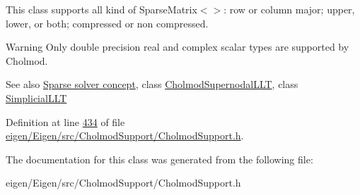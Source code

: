 This class supports all kind of Sparse\+Matrix$<$$>$\+: row or column major; upper, lower, or both; compressed or non compressed.

\begin{DoxyWarning}{Warning}
Only double precision real and complex scalar types are supported by Cholmod.
\end{DoxyWarning}
\begin{DoxySeeAlso}{See also}
\hyperlink{SparseLinearSystems.dox_TutorialSparseSolverConcept}{Sparse solver concept}, class \hyperlink{class_eigen_1_1_cholmod_supernodal_l_l_t}{Cholmod\+Supernodal\+L\+LT}, class \hyperlink{group___sparse_cholesky___module_class_eigen_1_1_simplicial_l_l_t}{Simplicial\+L\+LT} 
\end{DoxySeeAlso}


Definition at line \hyperlink{eigen_2_eigen_2src_2_cholmod_support_2_cholmod_support_8h_source_l00434}{434} of file \hyperlink{eigen_2_eigen_2src_2_cholmod_support_2_cholmod_support_8h_source}{eigen/\+Eigen/src/\+Cholmod\+Support/\+Cholmod\+Support.\+h}.



The documentation for this class was generated from the following file\+:\begin{DoxyCompactItemize}
\item 
eigen/\+Eigen/src/\+Cholmod\+Support/\+Cholmod\+Support.\+h\end{DoxyCompactItemize}
